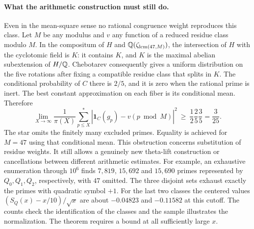 \paragraph{What the arithmetic construction must still do.}
Even in the mean-square sense no rational congruence weight reproduces this class. Let $M$ be any modulus and $v$ any function of a reduced residue class modulo $M$. In the compositum of $H$ and $\mathbb Q(\zeta_{\operatorname{lcm}(47,M)})$, the intersection of $H$ with the cyclotomic field is $K$: it contains $K$, and $K$ is the maximal abelian subextension of $H/\mathbb Q$. Chebotarev consequently gives a uniform distribution on the five rotations after fixing a compatible residue class that splits in $K$. The conditional probability of $C$ there is $2/5$, and it is zero when the rational prime is inert. The best constant approximation on each fiber is its conditional mean. Therefore
\[
 \lim_{X\to\infty}\frac1{\pi(X)}\sum_{p\le X}^{*}
  |\mathbf1_C(g_p)-v(p\bmod M)|^2\ \ge\
 \frac12\frac25\frac35=\frac3{25}.
\]
The star omits the finitely many excluded primes. Equality is achieved for $M=47$ using that conditional mean. This obstruction concerns substitution of residue weights. It still allows a genuinely new theta-lift construction or cancellations between different arithmetic estimates. For example, an exhaustive enumeration through $10^6$ finds $7{,}819$, $15{,}692$ and $15{,}690$ primes represented by $Q_0,Q_1,Q_2$, respectively, with $47$ omitted. The three disjoint sets exhaust exactly the primes with quadratic symbol $+1$. For the last two classes the centered values $(S_Q(x)-x/10)/\sqrt x$ are about $-0.04823$ and $-0.11582$ at this cutoff. The counts check the identification of the classes and the sample illustrates the normalization. The theorem requires a bound at all sufficiently large $x$.

